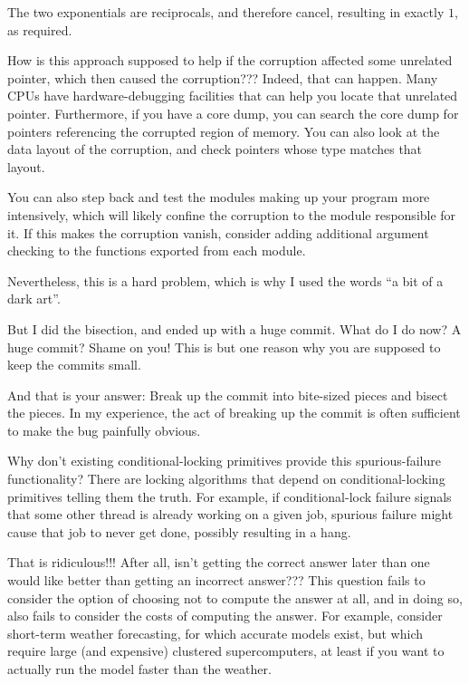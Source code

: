 	The two exponentials are reciprocals, and therefore cancel,
	resulting in exactly $1$, as required.

\QuickQ{}
	How is this approach supposed to help if the corruption affected some
	unrelated pointer, which then caused the corruption???
\QuickA{}
	Indeed, that can happen.
	Many CPUs have hardware-debugging facilities that can help you
	locate that unrelated pointer.
	Furthermore, if you have a core dump, you can search the core
	dump for pointers referencing the corrupted region of memory.
	You can also look at the data layout of the corruption, and
	check pointers whose type matches that layout.

	You can also step back and test the modules making up your
	program more intensively, which will likely confine the corruption
	to the module responsible for it.
	If this makes the corruption vanish, consider adding additional
	argument checking to the functions exported from each module.

	Nevertheless, this is a hard problem, which is why I used the
	words ``a bit of a dark art''.

\QuickQ{}
	But I did the bisection, and ended up with a huge commit.
	What do I do now?
\QuickA{}
	A huge commit?
	Shame on you!
	This is but one reason why you are supposed to keep the commits small.

	And that is your answer: Break up the commit into bite-sized
	pieces and bisect the pieces.
	In my experience, the act of breaking up the commit is often
	sufficient to make the bug painfully obvious.

\QuickQ{}
	Why don't existing conditional-locking primitives provide this
	spurious-failure functionality?
\QuickA{}
	There are locking algorithms that depend on conditional-locking
	primitives telling them the truth.
	For example, if conditional-lock failure signals that
	some other thread is already working on a given job,
	spurious failure might cause that job to never get done,
	possibly resulting in a hang.

\QuickQ{}
	That is ridiculous!!!
	After all, isn't getting the correct answer later than one would like
	better than getting an incorrect answer???
\QuickA{}
	This question fails to consider the option of choosing not to
	compute the answer at all, and in doing so, also fails to consider
	the costs of computing the answer.
	For example, consider short-term weather forecasting, for which
	accurate models exist, but which require large (and expensive)
	clustered supercomputers, at least if you want to actually run
	the model faster than the weather.

